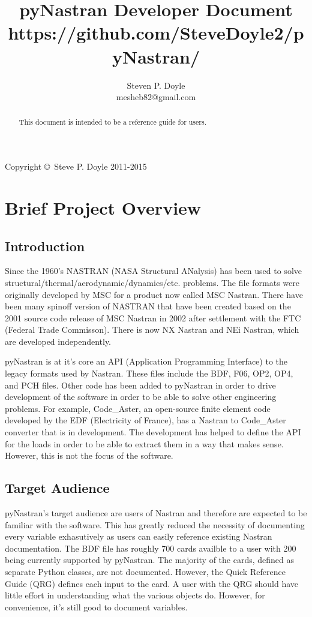 
\title{pyNastran Developer Document \\
\small https://github.com/SteveDoyle2/pyNastran/ }
\author{Steven P. Doyle\\
{\small mesheb82@gmail.com}
}

\maketitle

\begin{abstract}
This document is intended to be a reference guide for users.
\end{abstract}

Copyright \copyright\ Steve P. Doyle 2011-2015
\newpage

\tableofcontents
\newpage

\section{Brief Project Overview}
  \subsection{Introduction}
      Since the 1960's NASTRAN (NASA Structural ANalysis) has been used to solve structural/thermal/aerodynamic/dynamics/etc. problems.  The file formats were originally developed by MSC for a product now called MSC Nastran.  There have been many spinoff version of NASTRAN that have been created based on the 2001 source code release of MSC Nastran in 2002 after settlement with the FTC (Federal Trade Commisson).  There is now NX Nastran and NEi Nastran, which are developed independently.
     
     pyNastran is at it's core an API (Application Programming Interface) to the legacy formats used by Nastran.  These files include the BDF, F06, OP2, OP4, and PCH files.  Other code has been added to pyNastran in order to drive development of the software in order to be able to solve other engineering problems.  For example, Code\_Aster, an open-source finite element code developed by the EDF (Electricity of France), has a Nastran to Code\_Aster converter that is in development.  The development has helped to define the API for the loads in order to be able to extract them in a way that makes sense.  However, this is not the focus of the software.

  \subsection{Target Audience}
      pyNastran's target audience are users of Nastran and therefore are expected to be familiar with the software.  This has greatly reduced the necessity of documenting every variable exhasutively as users can easily reference existing Nastran documentation. The BDF file has roughly 700 cards availble to a user with 200 being currently supported by pyNastran.  The majority of the cards, defined as separate Python classes, are not documented.  However, the Quick Reference Guide (QRG) defines each input to the card.  A user with the QRG should have little effort in understanding what the various objects do.  However, for convenience, it's still good to document variables.

